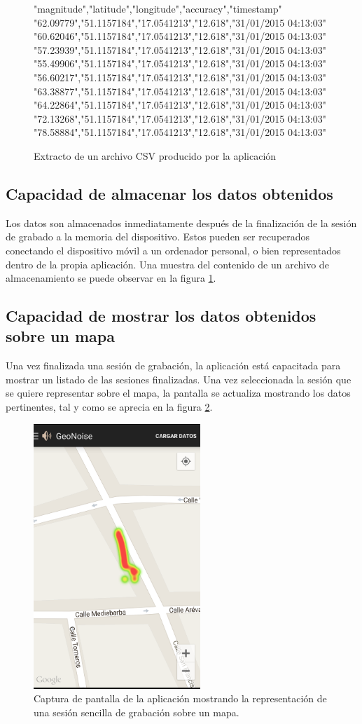 \begin{figure}[h] \centering
\begin{boxedverbatim}
"magnitude","latitude","longitude","accuracy","timestamp"
"62.09779","51.1157184","17.0541213","12.618","31/01/2015 04:13:03"
"60.62046","51.1157184","17.0541213","12.618","31/01/2015 04:13:03"
"57.23939","51.1157184","17.0541213","12.618","31/01/2015 04:13:03"
"55.49906","51.1157184","17.0541213","12.618","31/01/2015 04:13:03"
"56.60217","51.1157184","17.0541213","12.618","31/01/2015 04:13:03"
"63.38877","51.1157184","17.0541213","12.618","31/01/2015 04:13:03"
"64.22864","51.1157184","17.0541213","12.618","31/01/2015 04:13:03"
"72.13268","51.1157184","17.0541213","12.618","31/01/2015 04:13:03"
"78.58884","51.1157184","17.0541213","12.618","31/01/2015 04:13:03"
\end{boxedverbatim}
\caption{Extracto de un archivo CSV producido por la aplicación}
\label{fig:dump:file}
\end{figure}
\subsection{Capacidad de almacenar los datos obtenidos}
Los datos son almacenados inmediatamente después de la finalización de la sesión de grabado a la memoria del dispositivo. Estos pueden ser recuperados conectando el dispositivo móvil a un ordenador personal, o bien representados dentro de la propia aplicación. Una muestra del contenido de un archivo de almacenamiento se puede observar en la figura \ref{fig:dump:file}.

\subsection{Capacidad de mostrar los datos obtenidos sobre un mapa}
Una vez finalizada una sesión de grabación, la aplicación está capacitada para mostrar un listado de las sesiones finalizadas. Una vez seleccionada la sesión que se quiere representar sobre el mapa, la pantalla se actualiza mostrando los datos pertinentes, tal y como se aprecia en la figura \ref{fig:screen:heatmap}.

\begin{figure}[h] \centering
    \includegraphics[height=10cm]{graphs/screen_heatmap.png} \caption{Captura de pantalla de la aplicación mostrando la representación de una sesión sencilla de grabación sobre un mapa.}\label{fig:screen:heatmap}
\end{figure}


\chapterend{}
